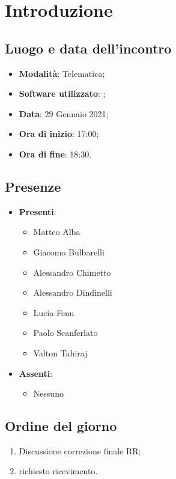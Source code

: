 \documentclass[]{article}
\begin{document}
	

	\newpage


		\section{Introduzione}
		\subsection{Luogo e data dell'incontro}
		\begin{itemize}
			\item \textbf{Modalità}: Telematica;
			\item \textbf{Software utilizzato}: ;
			\item \textbf{Data}: 29 Gennaio 2021;
			\item \textbf{Ora di inizio}: 17:00;
			\item \textbf{Ora di fine}: 18:30.
		\end{itemize}

		\subsection{Presenze}
		\begin{itemize}
			\item \textbf{Presenti}:
			\begin{itemize}
				\item Matteo Alba
				\item Giacomo Bulbarelli
				\item Alessandro Chimetto
				\item Alessandro Dindinelli
				\item Lucia Fenu
				\item Paolo Scanferlato
				\item Valton Tahiraj
			\end{itemize}
			\item \textbf{Assenti}:
			\begin{itemize}
				\item Nessuno
			\end{itemize}
		\end{itemize}


		\subsection{Ordine del giorno}
		\begin{enumerate}
			\item Discussione correzione finale RR;
			\item richiesto ricevimento.
		\end{enumerate}
\end{document}
